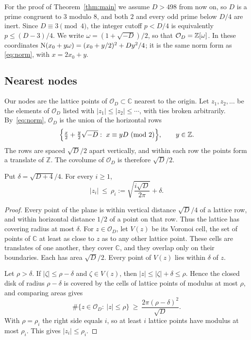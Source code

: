 For the proof of Theorem~\ref{thm:main} we assume
$D>498$ from now on, so $D$ is a prime congruent to $3$ modulo $8$, and both $2$
and every odd prime below $D/4$ are inert. Since $D\equiv3\pmod4$, the
integer cutoff $p<D/4$ is equivalently $p\leq(D-3)/4$. We write
$\omega=(1+\sqrt{-D})/2$, so that $\mathcal O_D=\mathbb Z[\omega]$. In these coordinates
$\operatorname{N}(x_0+y\omega)=(x_0+y/2)^2+Dy^2/4$; it is the same norm form as
\eqref{eq:norm}, with $x=2x_0+y$.

\subsection{Nearest nodes}\label{subsec:geometry}

Our nodes are the lattice points of $\mathcal{O}_D\subset\mathbb{C}$ nearest to
the origin. Let $z_1,z_2,\dots$ be the elements of $\mathcal{O}_D$
listed with $|z_1|\le|z_2|\le\cdots$, with ties broken arbitrarily.
By~\eqref{eq:norm}, $\mathcal{O}_D$ is the union of the horizontal rows
\[
  \Bigl\{\tfrac{x}{2}+\tfrac{y}{2}\sqrt{-D}:\ x\equiv yD\ (\mathrm{mod}\ 2)\Bigr\},
  \qquad y\in\mathbb{Z}.
\]
The rows are spaced $\sqrt D/2$ apart vertically, and within each row the
points form a translate of $\mathbb{Z}$. The covolume of $\mathcal{O}_D$ is
therefore $\sqrt D/2$.

\begin{lemma}\label{lem:node-disk}
Put $\delta=\sqrt{D+4}/4$. For every $i\ge1$,
\begin{equation}\label{eq:node-disk}
  |z_i|\ \le\ \rho_i:=\sqrt{\frac{i\sqrt D}{2\pi}}+\delta .
\end{equation}
\end{lemma}

\begin{proof}
Every point of the plane is within vertical distance $\sqrt D/4$ of a
lattice row, and within horizontal distance $1/2$ of a point on that row.
Thus the lattice has covering radius at most $\delta$.
For $z\in\mathcal{O}_D$, let $V(z)$ be its Voronoi cell, the set of
points of $\mathbb{C}$ at least as close to $z$ as to any other lattice
point. These cells are translates of one another, they cover $\mathbb{C}$, and
they overlap only on their boundaries. Each has area $\sqrt D/2$. Every point of $V(z)$ lies within $\delta$ of $z$.

Let $\rho>\delta$. If $|\zeta|\le\rho-\delta$ and $\zeta\in V(z)$, then
$|z|\le|\zeta|+\delta\le\rho$. Hence the closed disk of radius
$\rho-\delta$ is covered by the cells of lattice points of modulus at most
$\rho$, and comparing areas gives
\[
  \#\{z\in\mathcal{O}_D:\ |z|\le\rho\}\ \ge\
  \frac{2\pi(\rho-\delta)^2}{\sqrt D}.
\]
With $\rho=\rho_i$ the right side equals $i$, so at least $i$ lattice points
have modulus at most $\rho_i$. This gives $|z_i|\le\rho_i$.
\end{proof}

